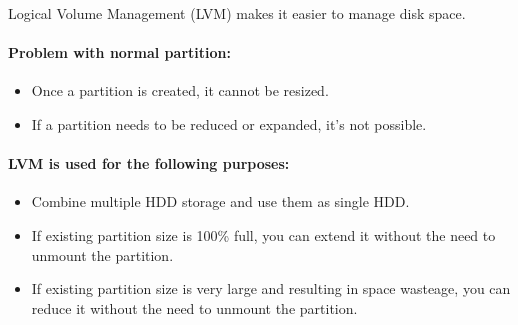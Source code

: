 \setlength{\columnsep}{3pt}
\begin{flushleft}
	\bigskip
	Logical Volume Management (LVM) makes it easier to manage disk space. 
\bigskip

\paragraph{Problem with normal partition:}
	\begin{itemize}
		\item Once a partition is created, it cannot be resized. 
		\item If a partition needs to be reduced or expanded, it's not possible.	
	\end{itemize}

\bigskip

\paragraph{LVM is used for the following purposes:}
\begin{itemize}
	\item Combine multiple HDD storage and use them as single HDD.
	\item If existing partition size is 100\% full, you can extend it without the need to unmount the partition.
	\item If existing partition size is very large and resulting in space wasteage, you can reduce it without the need to unmount the partition.
\end{itemize}

	
\end{flushleft}

\newpage

